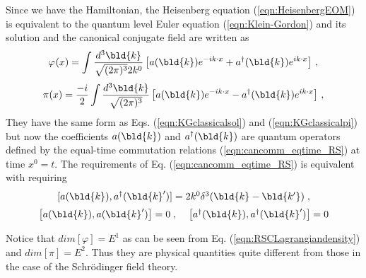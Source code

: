 Since we have the Hamiltonian,
the Heisenberg equation (\ref{eqn:HeisenbergEOM}) is equivalent to the
quantum level Euler equation (\ref{eqn:Klein-Gordon}) and its solution 
and the canonical conjugate field are written as
\begin{equation}
\varphi_{}(x) = \int \frac{d^3 \bld{k}}{\sqrt{(2\pi)^3}2k^0} \left[
a(\bld{k}) e^{-i k \cdot x} + a^\dagger(\bld{k})e^{i k \cdot x} \right]\,,
\label{eqn:RS_fieldexpansion}
\end{equation}
\begin{equation}
\pi_{}(x) 
=
\frac{-i}{2}
\int \frac{d^3 \bld{k}}{\sqrt{(2\pi)^3}}  \left[
a(\bld{k}) e^{-i k \cdot x} - a^\dagger(\bld{k})e^{i k \cdot x} \right]\,,
\label{eqn:RS_pifieldexpansion}
\end{equation}
They have the same form as Eqs. (\ref{eqn:KGclassicalsol}) and (\ref{eqn:KGclassicalpi})
but now the coefficients $a(\bld{k})$ and $a^\dagger(\bld{k})$ are
quantum operators defined by the equal-time commutation relations (\ref{eqn:cancomm_eqtime_RS})
at time $x^0 = t$.
The requirements of Eq. (\ref{eqn:cancomm_eqtime_RS}) is equivalent with
requiring
\begin{equation}
\begin{array}{c}
[ a(\bld{k}), a^\dagger(\bld{k}')] = 2k^0 \delta^3 (\bld{k} - \bld{k'} )\;,
\vspace{2mm}
\\
\left[ a(\bld{k}), a(\bld{k}') \right] = 0\;,\;\;\;\;\left[ a^\dagger(\bld{k}), a^\dagger(\bld{k}') \right] = 0
\end{array}
\label{eqn:cancomm_RS}
\end{equation}



Notice that $dim [\varphi] = E^1$ as can be seen from Eq. (\ref{eqn:RSCLagrangiandensity})
and $dim [\pi] = E^2$. Thus they are physical quantities  quite different from
those in the case of the Schr\"odinger field theory.\\

